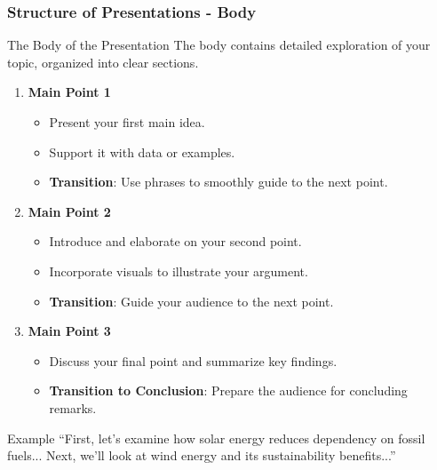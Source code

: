 \documentclass[aspectratio=169]{beamer}
\begin{document}
\begin{frame}[fragile]
    \frametitle{Structure of Presentations - Body}
    \begin{block}{The Body of the Presentation}
        The body contains detailed exploration of your topic, organized into clear sections.
    \end{block}

    \begin{enumerate}
        \item \textbf{Main Point 1}
            \begin{itemize}
                \item Present your first main idea.
                \item Support it with data or examples.
                \item \textbf{Transition}: Use phrases to smoothly guide to the next point.
            \end{itemize}
        
        \item \textbf{Main Point 2}
            \begin{itemize}
                \item Introduce and elaborate on your second point.
                \item Incorporate visuals to illustrate your argument.
                \item \textbf{Transition}: Guide your audience to the next point.
            \end{itemize}
        
        \item \textbf{Main Point 3}
            \begin{itemize}
                \item Discuss your final point and summarize key findings.
                \item \textbf{Transition to Conclusion}: Prepare the audience for concluding remarks.
            \end{itemize}
    \end{enumerate}

    \begin{block}{Example}
        “First, let’s examine how solar energy reduces dependency on fossil fuels... Next, we’ll look at wind energy and its sustainability benefits...”
    \end{block}
\end{frame}
\end{document}
